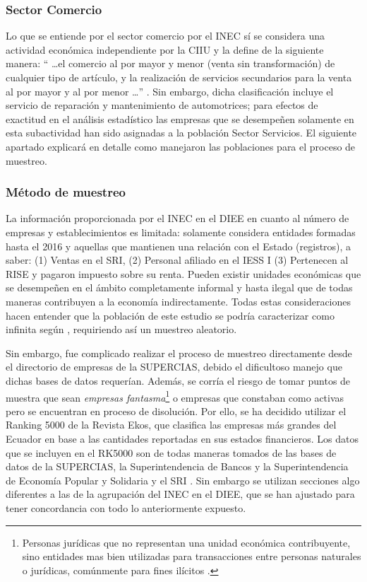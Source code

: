 \documentclass[12pt,a4paper,twoside]{article}
\begin{document}
\subsubsection{Sector Comercio}\label{subsubsec:comercio}
Lo que se entiende por el sector comercio por el INEC sí se considera una actividad económica independiente por la CIIU y la define de la siguiente manera: 
\enquote{
    \ldots el comercio al por mayor y menor (venta sin transformación) de cualquier tipo de artículo, y la realización de servicios secundarios para la venta al por mayor y al por menor \ldots} \parencite{clasificaciondeinstitutonacionaldeestadisticaycensos}.
Sin embargo, dicha clasificación incluye el servicio de reparación y mantenimiento de automotrices; para efectos de exactitud en el análisis estadístico las empresas que se desempeñen solamente en esta subactividad han sido asignadas a la población Sector Servicios. El siguiente apartado explicará en detalle como manejaron las poblaciones para el proceso de muestreo.

\subsubsection{Método de muestreo}\label{subsubsec:muestreo}
La información proporcionada por el INEC en el DIEE en cuanto al número de empresas y establecimientos es limitada: solamente considera entidades formadas hasta el 2016 y aquellas que mantienen una relación con el Estado (registros), a saber: (1) Ventas en el SRI, (2) Personal afiliado en el IESS I (3) Pertenecen al RISE y pagaron impuesto sobre su renta. Pueden existir unidades económicas que se desempeñen en el ámbito completamente informal y hasta ilegal que de todas maneras contribuyen a la economía indirectamente. Todas estas consideraciones hacen entender que la población de este estudio se podría caracterizar como infinita según \textcite{estadisticaanderson}, requiriendo así un muestreo aleatorio.

Sin embargo, fue complicado realizar el proceso de muestreo directamente desde el directorio de empresas de la SUPERCIAS, debido el dificultoso manejo que dichas bases de datos requerían. Además, se corría el riesgo de tomar puntos de muestra que sean \textit{empresas fantasma}\footnote{Personas jurídicas que no representan una unidad económica contribuyente, sino entidades mas bien utilizadas para transacciones entre personas naturales o jurídicas, comúnmente para fines ilícitos \parencite{directoriodeinstitutodeestadisticaycensos}.} o empresas que constaban como activas pero se encuentran en proceso de disolución. Por ello, se ha decidido utilizar el Ranking 5000 de la Revista Ekos, que clasifica las empresas más grandes del Ecuador en base a las cantidades reportadas en sus estados financieros. Los datos que se incluyen en el RK5000 son de todas maneras tomados de las bases de datos de la SUPERCIAS, la Superintendencia de Bancos y la Superintendencia de Economía Popular y Solidaria y el SRI \parencite{manualpararevistaekos}. Sin embargo se utilizan secciones algo diferentes a las de la agrupación del INEC en el DIEE, que se han ajustado para tener concordancia con todo lo anteriormente expuesto.
\end{document}
